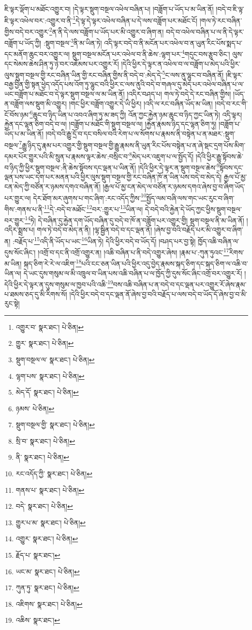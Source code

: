 ཇི་ལྟར་ལྡོག་པ་མཐོང་འགྱུར་བ། །དེ་ལྟར་སྡུག་བསྔལ་འཕེལ་བཞིན་པ། །བཟློག་པ་ཡོད་པ་མ་ཡིན་ནོ། །བདེ་བ་ཇི་ལྟ་ཇི་ལྟར་འཕེལ་བར་:འགྱུར་བ་ནི་\footnote{འགྱུར་བ་  སྣར་ཐང་།  པེ་ཅིན། }དེ་ལྟ་དེ་ལྟར་འཕེལ་བཞིན་པ་དེ་ལས་བཟློག་པར་མཐོང་ངོ། །གལ་ཏེ་རང་བཞིན་གྱིས་བདེ་བར་འགྱུར་\footnote{གྱུར་  སྣར་ཐང་།  པེ་ཅིན། }ན་ནི་དེ་ལས་བཟློག་པ་ཡོད་པར་མི་འགྱུར་བ་ཞིག་ན། བདེ་བ་འཕེལ་བཞིན་པ་ལ་ནི་དེ་ལྟར་བཟློག་པ་ཡོད་ཀྱི། :སྡུག་བསྔལ་\footnote{སྡུག་བསྔལ་ལ་  སྣར་ཐང་།  པེ་ཅིན། }ནི་མ་ཡིན་ཏེ། འདི་ལྟར་བདེ་བ་ནི་མངོན་པར་འཕེལ་བ་ན་ཡུན་རིང་པོས་སྨད་པ་དང་མནོག་ཆུང་བར་འགྱུར་ལ། སྡུག་བསྔལ་མངོན་པར་འཕེལ་བ་ནི་ཆེས་:ལྷག་པར་\footnote{ལྷག་པས་  སྣར་ཐང་།  པེ་ཅིན། }གདུང་བས་རྩུབ་ཅིང་། ལུས་དང་སེམས་ཆེས་ཤིན་ཏུ་ཉེ་བར་འཇོམས་པར་འགྱུར་རོ། །དེའི་ཕྱིར་དེ་ལྟར་ན་འཕེལ་བ་ལ་བཟློག་པ་མེད་པའི་ཕྱིར་ལུས་སྡུག་བསྔལ་གྱི་རང་བཞིན་ཡིན་གྱི་རང་བཞིན་གྱིས་ནི་བདེ་བ་:མེད་དེ་\footnote{མེད་དོ་  སྣར་ཐང་།  པེ་ཅིན། }ང་ལས་ནུ་ལྷུང་བ་བཞིན་ནོ། །ཇི་ལྟར་བརྒྱ་བྱིན་གྱི་སྟན་ཕྱེད་འདོད་པས་འོག་ཏུ་ལྷུང་བའི་ཕྱིར་ང་ལས་ནུའི་བདེ་བ་གཞལ་དུ་མེད་པར་འཕེལ་བཞིན་པ་ལ་ཡང་བཟློག་པ་མཐོང་བ་དེ་ལྟར་སྡུག་བསྔལ་ལ་མ་ཡིན་ནོ། །འདིར་བཤད་པ། གལ་ཏེ་བདེ་དེ་རང་བཞིན་གྱིས། །ཡོད་ན་བཟློག་ལས་སྡུག་མི་འགྱུར། །གང་ཕྱིར་བཟློག་འགྱུར་དེ་ཡི་ཕྱིར། །འདི་ལ་རང་བཞིན་ཡོད་མ་ཡིན། །བདེ་བ་རང་གི་ངོ་བོས་ཉམ་\footnote{ཉམས་  པེ་ཅིན། }ཆུང་བ་ཉིད་ཡིན་པ་འབའ་ཞིག་ཏུ་མ་ཟད་ཀྱི། འོན་ཀྱང་རྐྱེན་ཉམ་ཆུང་བ་ཉིད་ཀྱང་ཡིན་ཏེ། འདི་ལྟར། རྐྱེན་དང་ལྷན་ཅིག་བདེ་བ་ལ། །བཟློག་པ་མཐོང་གི་སྡུག་བསྔལ་ལ། །རྐྱེན་རྣམས་ཉིད་དང་ལྷན་ཅིག་ཏུ། །བཟློག་པ་ཡོད་པ་མ་ཡིན་ནོ། །བདེ་བའི་རྒྱུ་དྲོ་བ་དང་བསིལ་བའི་རེག་པ་ལ་སོགས་པ་རྣམས་ནི་བསྟེན་པ་ན་མཐར་:སྡུག་བསྔལ་\footnote{སྡུག་བསྔལ་གྱི་  སྣར་ཐང་།  པེ་ཅིན། }རྒྱུ་ཉིད་དུ་རྣམ་པར་འགྱུར་གྱི་སྡུག་བསྔལ་གྱི་རྒྱུ་རྣམས་ནི་ཡུན་རིང་པོས་བསྟེན་པ་ན་ཞེ་སྡང་དྲག་པོས་མིག་དམར་པོར་གྱུར་པའི་མི་སྲུན་པ་རྣམས་ལྟར་ཆེས་:བསྲིང་བ་\footnote{སྲི་བ་  སྣར་ཐང་།  པེ་ཅིན། }མེད་པར་འཇུག་པ་ལ་སྤྱོད་དོ། །དེའི་ཕྱིར་རྒྱུ་སྟོབས་ཆེ་བ་ཉིད་ཀྱི་ཕྱིར་སྡུག་བསྔལ་:ནི་ཆེས་སྟོབས་དང་ལྡན་པ་ཡིན་ནོ། །དེའི་ཕྱིར་དེ་ལྟར་ན་སྡུག་བསྔལ་ཆེས་\footnote{ནི་  སྣར་ཐང་།  པེ་ཅིན། }སྟོབས་དང་ལྡན་པས་ཡང་དག་པར་མནན་པའི་ཕྱིར་ལུས་སྡུག་བསྔལ་གྱི་རང་བཞིན་ཁོ་ན་ཡིན་པས་བདེ་བ་མེད་དེ། རྒྱལ་པོ་མྱ་ངན་མེད་ཀྱི་བཙོན་ར་ཉམས་དགའ་བཞིན་ནོ། །རྒྱལ་པོ་མྱ་ངན་མེད་ལ་བཙོན་ར་ཉམས་དགའ་ཞེས་བྱ་བ་ཞིག་ཡོད་པར་གྱུར་ལ། དེར་ཐོག་མར་ཞུགས་པ་གང་ཞིག་:རང་འདོད་ཀྱིས་\footnote{རང་འདོད་ཀྱི་  སྣར་ཐང་།  པེ་ཅིན། }སྤྱོད་ལམ་བཞི་ལས་གང་ཡང་རུང་བ་ཞིག་གིས་:གནས་པ་ནི་\footnote{གནས་པ་  སྣར་ཐང་།  པེ་ཅིན། }དེ་:བདེ་བ་མཐོང་\footnote{བདེ་  སྣར་ཐང་།  པེ་ཅིན། }བར་:གྱུར་པ་\footnote{གྱུར་པ་མ་  སྣར་ཐང་།  པེ་ཅིན། }ཡིན་ལ། དེ་བདེ་བའི་རྐྱེན་དེ་ཡོད་ཀྱང་ཕྱིས་སྡུག་བསྔལ་བར་གྱུར་\footnote{འགྱུར་  སྣར་ཐང་།  པེ་ཅིན། }ཏེ། དེ་བཞིན་དུ་རྐྱེན་དག་ཡོད་བཞིན་དུ་བདེ་བ་ཁོ་ན་བཟློག་པར་འགྱུར་གྱི། སྡུག་བསྔལ་ནི་མ་ཡིན་ནོ། །འདིར་སྨྲས་པ། གལ་ཏེ་བདེ་བ་མེད་ན་ནི། །ལྷ་སྦྱིན་བདེ་བ་དང་ལྡན་ནོ། །ཞེས་བྱ་བའི་བརྗོད་པར་མི་འགྱུར་བ་ཞིག་ན། :བརྗོད་པ་\footnote{རྗོད་པ་  སྣར་ཐང་། }འདི་ནི་ཡོད་པ་ཡང་\footnote{ཡང་མ་  སྣར་ཐང་།  པེ་ཅིན། }ཡིན་ཏེ། དེའི་ཕྱིར་བདེ་བ་ཡོད་དོ། །བཤད་པར་བྱ་སྟེ། ཁྱོད་འཆི་བཞིན་ལ་དུས་སོང་ཞིང་། །འགྲོ་བ་དང་ནི་འགྲོ་འགྱུར་ན། །འཆི་བཞིན་པ་ནི་བདེ་འགྱུར་ཞེས། །རྣམ་པ་:ཀུན་ཏུའང་\footnote{ཀུན་ཏུ་  སྣར་ཐང་།  པེ་ཅིན། }རིགས་མ་ཡིན། སྐད་ཅིག་རེ་རེ་ལ་འཇིག་\footnote{འཇིགས་  སྣར་ཐང་།  པེ་ཅིན། }པའི་ངང་ཅན་ཡིན་པའི་ཕྱིར་འདུ་བྱེད་རྣམས་སྐད་ཅིག་དང་སྐད་ཅིག་ལ་འཆི་བ་ཡིན་ལ། དེ་ཡང་དུས་གསུམ་ལ་མི་འཁྲུལ་བ་ཡིན་པས་འཆི་བཞིན་པ་ལ་ཁྱོད་ཀྱི་དུས་སོང་ཞིང་འགྲོ་བར་འགྱུར་རོ། །དེའི་ཕྱིར་དེ་ལྟར་ན་དུས་གསུམ་ལ་ཁྱབ་པའི་འཆི་\footnote{འཆིས་  སྣར་ཐང་། }བས་འཆི་བཞིན་པ་ན་བདེ་བ་དང་ལྡན་པར་འགྱུར་རོ་ཞེས་རྣམ་པ་ཐམས་ཅད་དུ་མི་རིགས་སོ། །དེའི་ཕྱིར་བདེ་བ་དང་ལྡན་ནོ་ཞེས་བྱ་བའི་བརྗོད་པ་ལས་བདེ་བ་ཡོད་དོ་ཞེས་བྱ་བ་མི་རུང་སྟེ། 